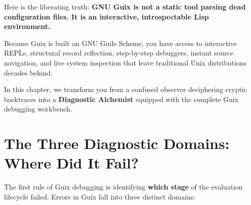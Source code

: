 Here is the liberating truth: \textbf{GNU Guix is not a static tool parsing dead configuration files. It is an interactive, introspectable Lisp environment.} 

Because Guix is built on GNU Guile Scheme, you have access to interactive REPLs, structural record reflection, step-by-step debuggers, instant source navigation, and live system inspection that leave traditional Unix distributions decades behind. 

In this chapter, we transform you from a confused observer deciphering cryptic backtraces into a \textbf{Diagnostic Alchemist} equipped with the complete Guix debugging workbench.

\section{The Three Diagnostic Domains: Where Did It Fail?}

The first rule of Guix debugging is identifying \textbf{which stage} of the evaluation lifecycle failed. Errors in Guix fall into three distinct domains:

